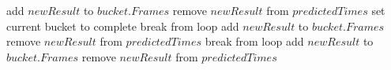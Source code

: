 ﻿\documentclass[a4paper]{article}
\begin{document}
\begin{algorithm}
\begin{algorithmic}[1]
                                        \State add $newResult$ to $bucket.Frames$
                                        \State remove $newResult$ from $predictedTimes$
                                        \State set current bucket to complete
                                        \State break from loop
                                    \EndIf
                                \Else
                                    \State add $newResult$ to $bucket.Frames$
                                    \State remove $newResult$ from $predictedTimes$
                                    \State break from loop
                                \EndIf
                            \EndFor
                        \Else
                            \State add $newResult$ to $bucket.Frames$
                            \State remove $newResult$ from $predictedTimes$
                        \EndIf
                    \EndIf
                \EndFor
            \EndWhile
        \end{algorithmic}
    \end{algorithm}
\end{document}
